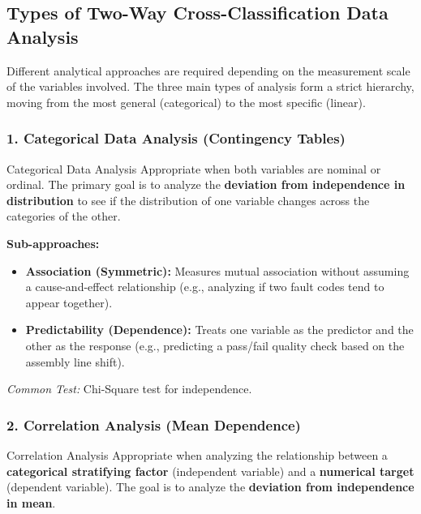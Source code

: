 \subsection{Types of Two-Way Cross-Classification Data Analysis}

Different analytical approaches are required depending on the measurement scale of the variables involved. The three main types of analysis form a strict hierarchy, moving from the most general (categorical) to the most specific (linear).

\subsubsection{1. Categorical Data Analysis (Contingency Tables)}

\begin{defbox}{Categorical Data Analysis}
Appropriate when both variables are nominal or ordinal. The primary goal is to analyze the \textbf{deviation from independence in distribution} to see if the distribution of one variable changes across the categories of the other.
\end{defbox}

\textbf{Sub-approaches:}
\begin{itemize}
    \item \textbf{Association (Symmetric):} Measures mutual association without assuming a cause-and-effect relationship (e.g., analyzing if two fault codes tend to appear together).
    \item \textbf{Predictability (Dependence):} Treats one variable as the predictor and the other as the response (e.g., predicting a pass/fail quality check based on the assembly line shift).
\end{itemize}
\textit{Common Test:} Chi-Square test for independence.

\subsubsection{2. Correlation Analysis (Mean Dependence)}

\begin{defbox}{Correlation Analysis}
Appropriate when analyzing the relationship between a \textbf{categorical stratifying factor} (independent variable) and a \textbf{numerical target} (dependent variable). The goal is to analyze the \textbf{deviation from independence in mean}.
\end{defbox}

